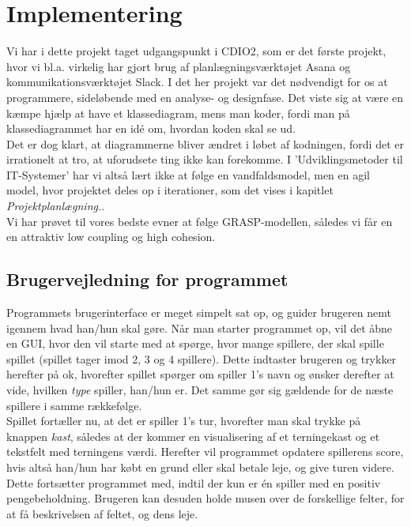 \chapter{Implementering}
Vi har i dette projekt taget udgangspunkt i CDIO2, som er det første projekt, hvor vi bl.a. virkelig har gjort brug af planlægningsværktøjet Asana og kommunikationsværktøjet Slack.
I det her projekt var det nødvendigt for os at programmere, sideløbende med en analyse- og designfase.
Det viste sig at være en kæmpe hjælp at have et klassediagram, mens man koder, fordi man på klassediagrammet har en idé om, hvordan koden skal se ud.
\\
Det er dog klart, at diagrammerne bliver ændret i løbet af kodningen, fordi det er irrationelt at tro, at uforudsete ting ikke kan forekomme.
I 'Udviklingsmetoder til IT-Systemer' har vi altså lært ikke at følge en vandfaldsmodel, men en agil model, hvor projektet deles op i iterationer, som det vises i kapitlet \textit{Projektplanlægning.}.
\\
Vi har prøvet til vores bedste evner at følge GRASP-modellen, således vi får en en attraktiv low coupling og high cohesion.

\section{Brugervejledning for programmet}
Programmets brugerinterface er meget simpelt sat op, og guider brugeren nemt igennem hvad han/hun skal gøre.
Når man starter programmet op, vil det åbne en GUI, hvor den vil starte med at spørge, hvor mange spillere, der skal spille spillet (spillet tager imod 2, 3 og 4 spillere).
Dette indtaster brugeren og trykker herefter på ok, hvorefter spillet spørger om spiller 1's navn og ønsker derefter at vide, hvilken \textit{type} spiller, han/hun er.
Det samme gør sig gældende for de næste spillere i samme rækkefølge.
\\
Spillet fortæller nu, at det er spiller 1's tur, hvorefter man skal trykke på knappen \textit{kast}, således at der kommer en visualisering af et terningekast og et tekstfelt med terningens værdi.
Herefter vil programmet opdatere spillerens score, hvis altså han/hun har købt en grund eller skal betale leje, og give turen videre.
Dette fortsætter programmet med, indtil der kun er én spiller med en positiv pengebeholdning.
Brugeren kan desuden holde musen over de forskellige felter, for at få beskrivelsen af feltet, og dens leje.

\pagebreak

